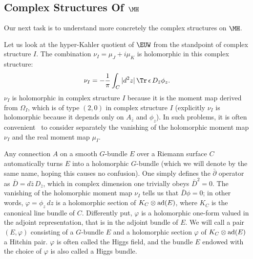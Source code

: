 
\subsection{Complex Structures Of $\MH$}

\label{sec:complexstr}

Our next task is to understand more concretely the complex
structures on $\MH$.

\par{}

Let us look at the hyper-Kahler quotient of $\EUW$ from the
standpoint of complex structure $I$. The combination
$\nu_I=\mu_J+i\mu_K$ is holomorphic in this complex structure:
\setcounter{equation}{19}
\begin{equation}\label{eq:uttup}
\nu_I=-{1\over \pi}\int_C|d^2z|\,\Tr\,\epsilon\,D_{\bar
z}\phi_z.
\end{equation}
 $\nu_I$ is holomorphic in complex structure $I$ because
it is the moment map derived from $\Omega_I$, which is of type
$(2,0)$ in complex structure $I$ (explicitly $\nu_I$ is
holomorphic because it depends only on $A_{\bar z}$ and $\phi_z$).
In such problems, it is often convenient \cite{ref61}\ to consider
separately the vanishing of the holomorphic moment map $\nu_I$ and
the real moment map $\mu_I$.

Any  connection $A$ on a smooth $G$-bundle $E$ over a Riemann
surface $C$ automatically turns $E$ into a holomorphic $G$-bundle
(which we will denote by the same name, hoping this causes no
confusion). One simply defines the $\bar\partial$ operator as
$\bar D=d\bar z\,D_{\bar z}$, which in complex dimension one
trivially obeys $\bar D^2=0$. The vanishing of the holomorphic
moment map $\nu_I$ tells us that $\bar D\phi=0$; in other words,
$\varphi=\phi_z\,dz$ is a holomorphic section of $K_C\otimes {\rm
ad}(E)$, where $K_C$ is the canonical line bundle of $C$.
Differently put, $\varphi$ is a holomorphic one-form valued in the
adjoint representation, that is in the adjoint bundle of $E$. We
will call a pair $(E,\varphi)$ consisting of a $G$-bundle $E$ and
a holomorphic section $\varphi$ of $K_C\otimes {\rm ad}(E)$ a
Hitchin pair.  $\varphi$ is often called the Higgs field, and the
bundle $E$ endowed with the choice of $\varphi$ is also called a
Higgs bundle.

